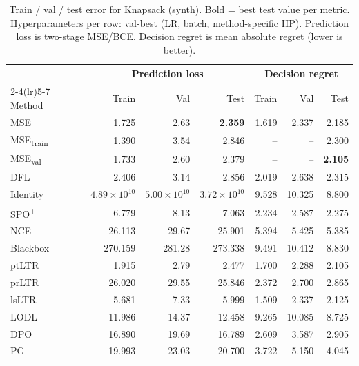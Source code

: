 \begin{table}[t]
\centering
\caption{Train / val / test error for Knapsack (synth). Bold = best test value per metric. Hyperparameters per row: val-best (LR, batch, method-specific HP). Prediction loss is two-stage MSE/BCE. Decision regret is mean absolute regret (lower is better).}
\label{tab:err-knapsack}
\setlength{\tabcolsep}{4pt}
\renewcommand{\arraystretch}{1.05}
\begin{tabular}{@{}lrrrrrr@{}}
\toprule
& \multicolumn{3}{c}{Prediction loss} & \multicolumn{3}{c}{Decision regret} \\
\cmidrule(lr){2-4}\cmidrule(lr){5-7}
Method & Train & Val & Test & Train & Val & Test \\
\midrule
MSE & 1.725 & 2.63 & \textbf{2.359} & 1.619 & 2.337 & 2.185 \\
MSE\textsubscript{train} & 1.390 & 3.54 & 2.846 & -- & -- & 2.300 \\
MSE\textsubscript{val} & 1.733 & 2.60 & 2.379 & -- & -- & \textbf{2.105} \\
DFL & 2.406 & 3.14 & 2.856 & 2.019 & 2.638 & 2.315 \\
Identity & $4.89{\times}10^{10}$ & $5.00{\times}10^{10}$ & $3.72{\times}10^{10}$ & 9.528 & 10.325 & 8.800 \\
SPO\textsuperscript{+} & 6.779 & 8.13 & 7.063 & 2.234 & 2.587 & 2.275 \\
NCE & 26.113 & 29.67 & 25.901 & 5.394 & 5.425 & 5.385 \\
Blackbox & 270.159 & 281.28 & 273.338 & 9.491 & 10.412 & 8.830 \\
ptLTR & 1.915 & 2.79 & 2.477 & 1.700 & 2.288 & 2.105 \\
prLTR & 26.020 & 29.55 & 25.846 & 2.372 & 2.700 & 2.865 \\
lsLTR & 5.681 & 7.33 & 5.999 & 1.509 & 2.337 & 2.125 \\
LODL & 11.986 & 14.37 & 12.458 & 9.265 & 10.085 & 8.725 \\
DPO & 16.890 & 19.69 & 16.789 & 2.609 & 3.587 & 2.905 \\
PG & 19.993 & 23.03 & 20.700 & 3.722 & 5.150 & 4.045 \\
\bottomrule
\end{tabular}
\end{table}

